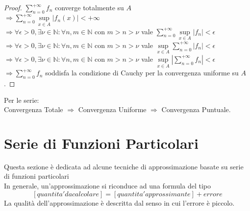 \begin{proof}
	$\sum\limits_{n=0}^{+\infty}f_n$ converge totalmente su $A$\\
	$\Rightarrow \sum\limits_{n=0}^{+\infty}\sup\limits_{x\in A}\left|f_n(x)\right|<+\infty$\\
	$\Rightarrow \forall\epsilon>0, \exists\nu\in\mathbb{N}: \forall n,m\in\mathbb{N}$ con $m>n>\nu$ vale $\sum\limits_{n=0}^{+\infty}\sup\limits_{x\in A}\left|f_n\right|<\epsilon$\\
	$\Rightarrow \forall\epsilon>0, \exists\nu\in\mathbb{N}: \forall n,m\in\mathbb{N}$ con $m>n>\nu$ vale $\sup\limits_{x\in A}\sum\limits_{n=0}^{+\infty}\left|f_n\right|<\epsilon$\\
	$\Rightarrow \forall\epsilon>0, \exists\nu\in\mathbb{N}: \forall n,m\in\mathbb{N}$ con $m>n>\nu$ vale $\sup\limits_{x\in A}\left|\sum\limits_{n=0}^{+\infty}f_n\right|<\epsilon$\\
	$\Rightarrow \sum\limits_{n=0}^{+\infty}f_n$ soddisfa la condizione di Cauchy per la convergenza uniforme su $A$.
\end{proof}
\observation
Per le serie:\\
Convergenza Totale $\Rightarrow$ Convergenza Uniforme $\Rightarrow$ Convergenza Puntuale.

\section{Serie di Funzioni Particolari}
Questa sezione è dedicata ad alcune tecniche di approssimazione  basate su serie di funzioni particolari\\
In generale, un'approssimazione si riconduce ad una formula del tipo\\
$$\left[quantita' da calcolare \right]=\left[ quantita' approssimante \right]+ errore$$
La qualità dell'approssimazione è descritta dal senso in cui l'errore è piccolo.\\
